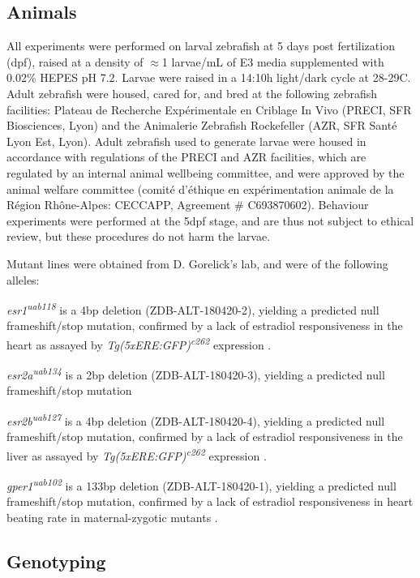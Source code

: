 \documentclass[10pt,lineno]{RandlettLab_elife}
\begin{document}
{\subsection{Animals}

All experiments were performed on larval zebrafish at 5 days post fertilization (dpf), raised at a density of $\approx$1 larvae/mL of E3 media supplemented with 0.02\% HEPES pH 7.2. 
Larvae were raised in a 14:10h light/dark cycle at 28-29\degree{}C. 
Adult zebrafish were housed, cared for, and bred at the following zebrafish facilities: Plateau de Recherche Expérimentale en Criblage In Vivo (PRECI, SFR Biosciences, Lyon) and the Animalerie Zebrafish Rockefeller (AZR, SFR Santé Lyon Est, Lyon). Adult zebrafish used to generate larvae were housed in accordance with regulations of the PRECI and AZR facilities, which are regulated by an internal animal wellbeing committee, and were approved by the animal welfare committee (comité d’éthique en expérimentation animale de la Région Rhône-Alpes: CECCAPP, Agreement \# C693870602). 
Behaviour experiments were performed at the 5dpf stage, and are thus not subject to ethical review, but these procedures do not harm the larvae. 

Mutant lines were obtained from D. Gorelick's lab, and were of the following alleles: 

\emph{esr1\textsuperscript{uab118}} is a 4bp deletion (ZDB-ALT-180420-2), yielding a predicted null frameshift/stop mutation, confirmed by a lack of estradiol responsiveness in the heart as assayed by \emph{Tg(5xERE:GFP)\textsuperscript{c262}} expression \citep{Romano2017-ep}. 

\emph{esr2a\textsuperscript{uab134}} is a 2bp deletion (ZDB-ALT-180420-3), yielding a predicted null frameshift/stop mutation \citep{Romano2017-ep}

\emph{esr2b\textsuperscript{uab127}} is a 4bp deletion (ZDB-ALT-180420-4), yielding a predicted null frameshift/stop mutation, confirmed by a lack of estradiol responsiveness in the liver as assayed by \emph{Tg(5xERE:GFP)\textsuperscript{c262}} expression \citep{Romano2017-ep}. 

\emph{gper1\textsuperscript{uab102}} is a 133bp deletion (ZDB-ALT-180420-1), yielding a predicted null frameshift/stop mutation, confirmed by a lack of estradiol responsiveness in heart beating rate in maternal-zygotic mutants \citep{Romano2017-ep}.

\subsection{Genotyping}

}
\end{document}
